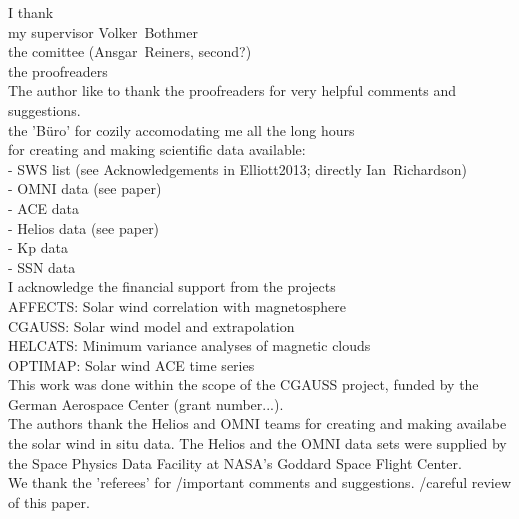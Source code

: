 


I thank\\
my supervisor Volker~Bothmer\\
the comittee (Ansgar~Reiners, second?)\\
the proofreaders\\
The author like to thank the proofreaders for very helpful comments and suggestions.\\
the 'Büro' for cozily accomodating me all the long hours\\

for creating and making scientific data available:\\
- SWS list (see Acknowledgements in Elliott2013; directly Ian~Richardson)\\
- OMNI data (see paper)\\
- ACE data\\
- Helios data (see paper)\\
- Kp data\\
- SSN data\\

I acknowledge the financial support from the projects\\
AFFECTS: Solar wind correlation with magnetosphere\\
CGAUSS: Solar wind model and extrapolation\\
HELCATS: Minimum variance analyses of magnetic clouds\\
OPTIMAP: Solar wind ACE time series\\


This work was done within the scope of the CGAUSS project, funded by the German Aerospace Center (grant number...).\\
The authors thank the Helios and OMNI teams for creating and making availabe the solar wind in situ data. The Helios and the OMNI data sets were supplied by the Space Physics Data Facility at NASA's Goddard Space Flight Center.\\
We thank the 'referees' for /important comments and suggestions. /careful review of this paper.\\

